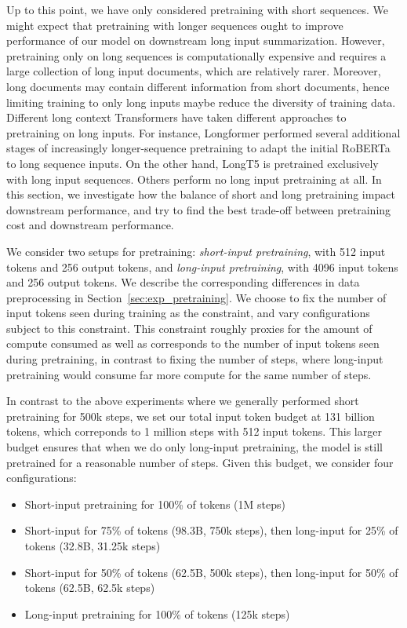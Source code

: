 \documentclass[11pt]{article}
\begin{document}
Up to this point, we have only considered pretraining with short sequences.
We might expect that pretraining with longer sequences ought to improve performance of our model on downstream long input summarization.
However, pretraining only on long sequences is computationally expensive and requires a large collection of long input documents, which are relatively rarer.
Moreover, long documents may contain different information from short documents, hence limiting training to only long inputs maybe reduce the diversity of training data.
Different long context Transformers have taken different approaches to pretraining on long inputs.
For instance, Longformer \citep{beltagy2020longformer} performed several additional stages of increasingly longer-sequence pretraining to adapt the initial RoBERTa to long sequence inputs.
On the other hand, LongT5 \citep{guo2021longt5} is pretrained exclusively with long input sequences.
Others \citep{zaheer2020bigbird, ivgi2022sled} perform no long input pretraining at all.
In this section, we investigate how the balance of short and long pretraining impact downstream performance, and try to find the best trade-off between pretraining cost and downstream performance.

We consider two setups for pretraining: \textit{short-input pretraining}, with 512 input tokens and 256 output tokens, and \textit{long-input pretraining}, with 4096 input tokens and 256 output tokens.
We describe the corresponding differences in data preprocessing in Section~\ref{sec:exp_pretraining}.
We choose to fix the number of input tokens seen during training as the constraint, and vary configurations subject to this constraint.
This constraint roughly proxies for the amount of compute consumed as well as corresponds to the number of input tokens seen during pretraining, in contrast to fixing the number of steps, where long-input pretraining would consume far more compute for the same number of steps.

In contrast to the above experiments where we generally performed short pretraining for 500k steps, we set our total input token budget at 131 billion tokens, which correponds to 1 million steps with 512 input tokens.
This larger budget ensures that when we do only long-input pretraining, the model is still pretrained for a reasonable number of steps.
Given this budget, we consider four configurations:

\begin{itemize}
    \item Short-input pretraining for 100\% of tokens (1M steps)
    \item Short-input for 75\% of tokens (98.3B, 750k steps), then long-input for 25\% of tokens (32.8B, 31.25k steps)
    \item Short-input for 50\% of tokens (62.5B, 500k steps), then long-input for 50\% of tokens (62.5B, 62.5k steps)
    \item Long-input pretraining for 100\% of tokens (125k steps)
\end{itemize}
\end{document}
